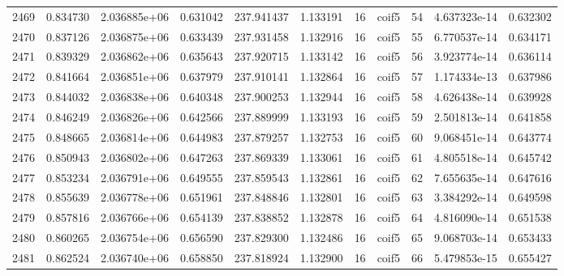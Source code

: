 \begin{tabular}{lrrrrrrlrrr}
2469 &    0.834730 &        2.036885e+06 &  0.631042 &              237.941437 &    1.133191 &      16 &        coif5 &     54 &   4.637323e-14 &      0.632302 \\
2470 &    0.837126 &        2.036875e+06 &  0.633439 &              237.931458 &    1.132916 &      16 &        coif5 &     55 &   6.770537e-14 &      0.634171 \\
2471 &    0.839329 &        2.036862e+06 &  0.635643 &              237.920715 &    1.133142 &      16 &        coif5 &     56 &   3.923774e-14 &      0.636114 \\
2472 &    0.841664 &        2.036851e+06 &  0.637979 &              237.910141 &    1.132864 &      16 &        coif5 &     57 &   1.174334e-13 &      0.637986 \\
2473 &    0.844032 &        2.036838e+06 &  0.640348 &              237.900253 &    1.132944 &      16 &        coif5 &     58 &   4.626438e-14 &      0.639928 \\
2474 &    0.846249 &        2.036826e+06 &  0.642566 &              237.889999 &    1.133193 &      16 &        coif5 &     59 &   2.501813e-14 &      0.641858 \\
2475 &    0.848665 &        2.036814e+06 &  0.644983 &              237.879257 &    1.132753 &      16 &        coif5 &     60 &   9.068451e-14 &      0.643774 \\
2476 &    0.850943 &        2.036802e+06 &  0.647263 &              237.869339 &    1.133061 &      16 &        coif5 &     61 &   4.805518e-14 &      0.645742 \\
2477 &    0.853234 &        2.036791e+06 &  0.649555 &              237.859543 &    1.132861 &      16 &        coif5 &     62 &   7.655635e-14 &      0.647616 \\
2478 &    0.855639 &        2.036778e+06 &  0.651961 &              237.848846 &    1.132801 &      16 &        coif5 &     63 &   3.384292e-14 &      0.649598 \\
2479 &    0.857816 &        2.036766e+06 &  0.654139 &              237.838852 &    1.132878 &      16 &        coif5 &     64 &   4.816090e-14 &      0.651538 \\
2480 &    0.860265 &        2.036754e+06 &  0.656590 &              237.829300 &    1.132486 &      16 &        coif5 &     65 &   9.068703e-14 &      0.653433 \\
2481 &    0.862524 &        2.036740e+06 &  0.658850 &              237.818924 &    1.132900 &      16 &        coif5 &     66 &   5.479853e-15 &      0.655427 \\

\end{tabular}
